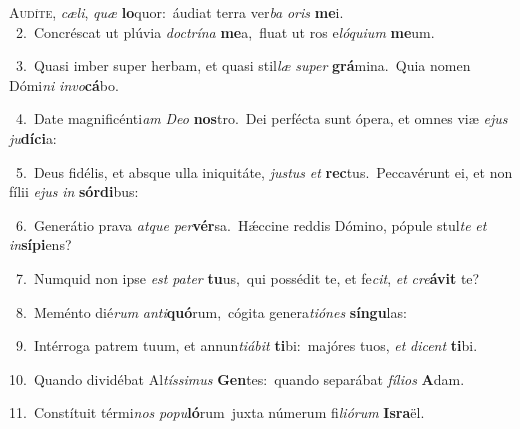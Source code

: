 \lettrine{\initial\textcolor{\initialcolor}{A}}{udíte,} \textit{cæ}\-\textit{li}, \textit{quæ} \textbf{lo}\-quor:~\star áudiat terra ver\textit{ba} \textit{o}\-\textit{ris} \textbf{me}\-i.\\
{\numbfont\textcolor{\numbcolor}{~2.}}~Concréscat ut plúvia \textit{doc}\-\textit{trí}\textit{na} \textbf{me}\-a,~\star fluat ut ros e\-\textit{ló}\-\textit{qui}\textit{um} \textbf{me}\-um.\par
{\numbfont\textcolor{\numbcolor}{~3.}}~Quasi imber super herbam, et quasi stil\textit{læ} \textit{su}\-\textit{per} \textbf{grá}\-mina.~\star Quia nomen Dómi\textit{ni} \textit{in}\-\textit{vo}\textbf{cá}bo.\par
{\numbfont\textcolor{\numbcolor}{~4.}}~Date magnificénti\textit{am} \textit{De}\-\textit{o} \textbf{nos}\-tro.~\star Dei perfécta sunt ópera, et omnes viæ \textit{e}\-\textit{jus} \textit{ju}\-\textbf{dí}\textbf{ci}a:\par
{\numbfont\textcolor{\numbcolor}{~5.}}~Deus fidélis, et absque ulla iniquitáte, \textit{jus}\-\textit{tus} \textit{et} \textbf{rec}\-tus.~\star Peccavérunt ei, et non fílii \textit{e}\-\textit{jus} \textit{in} \textbf{sór}\-\textbf{di}bus:\par
{\numbfont\textcolor{\numbcolor}{~6.}}~Generátio prava \textit{at}\-\textit{que} \textit{per}\-\textbf{vér}sa.~\star Hǽccine reddis Dómino, pópule stul\textit{te} \textit{et} \textit{in}\-\textbf{sí}\textbf{pi}ens?\par
{\numbfont\textcolor{\numbcolor}{~7.}}~Numquid non ipse \textit{est} \textit{pa}\-\textit{ter} \textbf{tu}\-us,~\star qui possédit te, et fe\-\textit{cit}\-, \textit{et} \textit{cre}\-\textbf{á}\textbf{vit} te?\par
{\numbfont\textcolor{\numbcolor}{~8.}}~Meménto dié\textit{rum} \textit{an}\-\textit{ti}\textbf{quó}rum,~\star cógita genera\-\textit{ti}\-\textit{ó}\textit{nes} \textbf{sín}\-\textbf{gu}las:\par
{\numbfont\textcolor{\numbcolor}{~9.}}~Intérroga patrem tuum, et annun\-\textit{ti}\-\textit{á}\textit{bit} \textbf{ti}\-bi:~\star majóres tuos, \textit{et} \textit{di}\-\textit{cent} \textbf{ti}\-bi.\par
{\numbfont\textcolor{\numbcolor}{10.}}~Quando dividébat Al\-\textit{tís}\-\textit{si}\textit{mus} \textbf{Gen}\-tes:~\star quando separábat \textit{fí}\-\textit{li}\textit{os} \textbf{A}\-dam.\par
{\numbfont\textcolor{\numbcolor}{11.}}~Constítuit térmi\textit{nos} \textit{po}\-\textit{pu}\textbf{ló}rum~\star juxta númerum fi\-\textit{li}\-\textit{ó}\textit{rum} \textbf{Is}\-\textbf{ra}ël.\par
